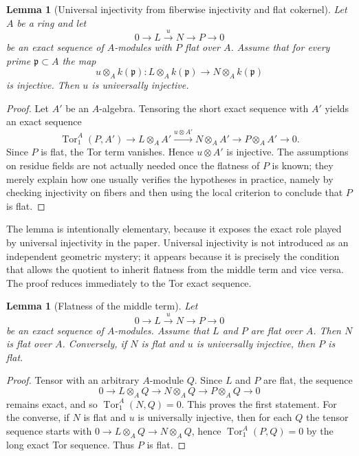 \documentclass[11pt,oneside]{article}
\newtheorem{lemma}[theorem]{Lemma}
\newcommand{\Tor}{\operatorname{Tor}}
\begin{document}
\begin{lemma}[Universal injectivity from fiberwise injectivity and flat cokernel]\label{lem:ui-fiberwise-long}
Let $A$ be a ring and let
\[
0\to L\xrightarrow{u} N\to P\to 0
\]
be an exact sequence of $A$-modules with $P$ flat over $A$.  Assume that for every prime $\mathfrak p\subset A$ the map
\[
u\otimes_A k(\mathfrak p)\colon L\otimes_A k(\mathfrak p)\to N\otimes_A k(\mathfrak p)
\]
is injective.  Then $u$ is universally injective.
\end{lemma}

\begin{proof}
Let $A'$ be an $A$-algebra.  Tensoring the short exact sequence with $A'$ yields an exact sequence
\[
\Tor_1^A(P,A')\to L\otimes_A A'\xrightarrow{u\otimes A'} N\otimes_A A'\to P\otimes_A A'\to 0.
\]
Since $P$ is flat, the Tor term vanishes.  Hence $u\otimes A'$ is injective.  The assumptions on residue fields are not actually needed once the flatness of $P$ is known; they merely explain how one usually verifies the hypotheses in practice, namely by checking injectivity on fibers and then using the local criterion to conclude that $P$ is flat.
\end{proof}

The lemma is intentionally elementary, because it exposes the exact role played by universal injectivity in the paper.  Universal injectivity is not introduced as an independent geometric mystery; it appears because it is precisely the condition that allows the quotient to inherit flatness from the middle term and vice versa.  The proof reduces immediately to the Tor exact sequence.

\begin{lemma}[Flatness of the middle term]\label{lem:middle-flat-long}
Let
\[
0\to L\xrightarrow{u} N\to P\to 0
\]
be an exact sequence of $A$-modules.  Assume that $L$ and $P$ are flat over $A$.  Then $N$ is flat over $A$.  Conversely, if $N$ is flat and $u$ is universally injective, then $P$ is flat.
\end{lemma}

\begin{proof}
Tensor with an arbitrary $A$-module $Q$.  Since $L$ and $P$ are flat, the sequence
\[
0\to L\otimes_A Q\to N\otimes_A Q\to P\otimes_A Q\to 0
\]
remains exact, and so $\Tor_1^A(N,Q)=0$.  This proves the first statement.  For the converse, if $N$ is flat and $u$ is universally injective, then for each $Q$ the tensor sequence starts with $0\to L\otimes_A Q\to N\otimes_A Q$, hence $\Tor_1^A(P,Q)=0$ by the long exact Tor sequence.  Thus $P$ is flat.
\end{proof}
\end{document}
